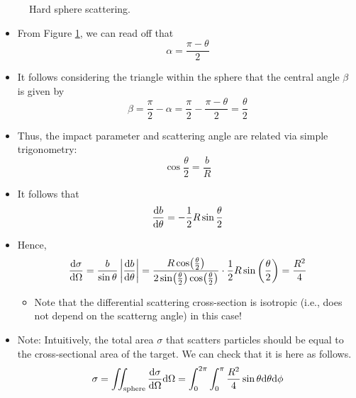 \documentclass[../notes.tex]{subfiles}
\begin{document}
\begin{itemize}
\begin{figure}[h!]
        \caption{Hard sphere scattering.}
        \label{fig:scatteringHS}
    \end{figure}
    \begin{itemize}
        \item From Figure \ref{fig:scatteringHS}, we can read off that
        \begin{equation*}
            \alpha = \frac{\pi-\theta}{2}
        \end{equation*}
        \item It follows considering the triangle within the sphere that the central angle $\beta$ is given by
        \begin{equation*}
            \beta = \frac{\pi}{2}-\alpha
            = \frac{\pi}{2}-\frac{\pi-\theta}{2}
            = \frac{\theta}{2}
        \end{equation*}
        \item Thus, the impact parameter and scattering angle are related via simple trigonometry:
        \begin{equation*}
            \cos\frac{\theta}{2} = \frac{b}{R}
        \end{equation*}
        \item It follows that
        \begin{equation*}
            \dv{b}{\theta} = -\frac{1}{2}R\sin\frac{\theta}{2}
        \end{equation*}
        \item Hence,
        \begin{equation*}
            \dv{\sigma}{\Omega} = \frac{b}{\sin\theta}\left| \dv{b}{\theta} \right|
            = \frac{R\cos(\frac{\theta}{2})}{2\sin(\frac{\theta}{2})\cos(\frac{\theta}{2})}\cdot\frac{1}{2}R\sin\left( \frac{\theta}{2} \right)
            = \frac{R^2}{4}
        \end{equation*}
        \begin{itemize}
            \item Note that the differential scattering cross-section is isotropic (i.e., does not depend on the scatterng angle) in this case!
        \end{itemize}
        \item Note: Intuitively, the total area $\sigma$ that scatters particles should be equal to the cross-sectional area of the target. We can check that it is here as follows.
        \begin{equation*}
            \sigma = \iint_\text{sphere}\dv{\sigma}{\Omega}\dd\Omega
            = \int_0^{2\pi}\int_0^\pi\frac{R^2}{4}\sin\theta\dd\theta\dd\phi

\end{equation*}
\end{itemize}
\end{itemize}
\end{document}
